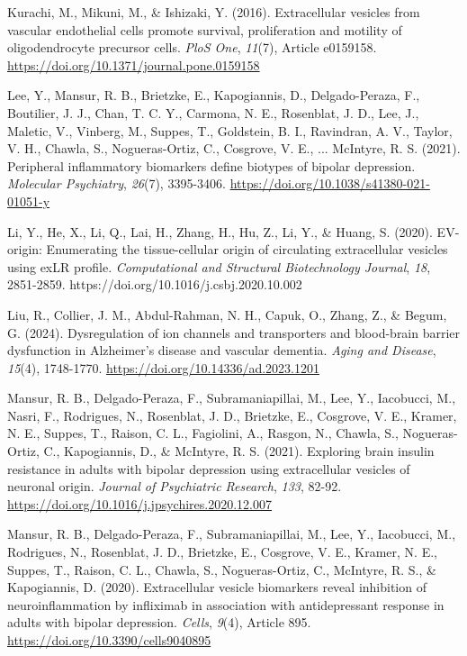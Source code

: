 \documentclass[authordate, empirical]{jote-new-article}
\begin{document}
	Kurachi, M., Mikuni, M., \& Ishizaki, Y. (2016). Extracellular vesicles from vascular endothelial cells promote survival, proliferation and motility of oligodendrocyte precursor cells. \emph{PloS One},\emph{ 11}(7), Article e0159158. \href{https://doi.org/10.1371/journal.pone.0159158}{https://doi.org/10.1371/journal.pone.0159158}



	Lee, Y., Mansur, R. B., Brietzke, E., Kapogiannis, D., Delgado-Peraza, F., Boutilier, J. J., Chan, T. C. Y., Carmona, N. E., Rosenblat, J. D., Lee, J., Maletic, V., Vinberg, M., Suppes, T., Goldstein, B. I., Ravindran, A. V., Taylor, V. H., Chawla, S., Nogueras-Ortiz, C., Cosgrove, V. E., ... McIntyre, R. S. (2021). Peripheral inflammatory biomarkers define biotypes of bipolar depression. \emph{Molecular Psychiatry},\emph{ 26}(7), 3395-3406. \href{https://doi.org/10.1038/s41380-021-01051-y}{https://doi.org/10.1038/s41380-021-01051-y}



	Li, Y., He, X., Li, Q., Lai, H., Zhang, H., Hu, Z., Li, Y., \& Huang, S. (2020). EV-origin: Enumerating the tissue-cellular origin of circulating extracellular vesicles using exLR profile. \emph{Computational and Structural Biotechnology Journal},\emph{ 18}, 2851-2859. https://doi.org/10.1016/j.csbj.2020.10.002



	Liu, R., Collier, J. M., Abdul-Rahman, N. H., Capuk, O., Zhang, Z., \& Begum, G. (2024). Dysregulation of ion channels and transporters and blood-brain barrier dysfunction in Alzheimer's disease and vascular dementia. \emph{Aging and Disease},\emph{ 15}(4), 1748-1770. \href{https://doi.org/10.14336/ad.2023.1201}{https://doi.org/10.14336/ad.2023.1201}



	Mansur, R. B., Delgado-Peraza, F., Subramaniapillai, M., Lee, Y., Iacobucci, M., Nasri, F., Rodrigues, N., Rosenblat, J. D., Brietzke, E., Cosgrove, V. E., Kramer, N. E., Suppes, T., Raison, C. L., Fagiolini, A., Rasgon, N., Chawla, S., Nogueras-Ortiz, C., Kapogiannis, D., \& McIntyre, R. S. (2021). Exploring brain insulin resistance in adults with bipolar depression using extracellular vesicles of neuronal origin. \emph{Journal of Psychiatric Research},\emph{ 133}, 82-92. \href{https://doi.org/10.1016/j.jpsychires.2020.12.007}{https://doi.org/10.1016/j.jpsychires.2020.12.007}



	Mansur, R. B., Delgado-Peraza, F., Subramaniapillai, M., Lee, Y., Iacobucci, M., Rodrigues, N., Rosenblat, J. D., Brietzke, E., Cosgrove, V. E., Kramer, N. E., Suppes, T., Raison, C. L., Chawla, S., Nogueras-Ortiz, C., McIntyre, R. S., \& Kapogiannis, D. (2020). Extracellular vesicle biomarkers reveal inhibition of neuroinflammation by infliximab in association with antidepressant response in adults with bipolar depression. \emph{Cells},\emph{ 9}(4), Article 895. \href{https://doi.org/10.3390/cells9040895}{https://doi.org/10.3390/cells9040895}
\end{document}
